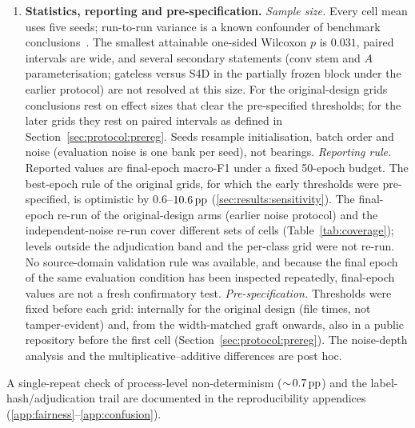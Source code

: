 \begin{enumerate}
\item \textbf{Statistics, reporting and pre-specification.} \emph{Sample size.} Every cell mean uses five seeds; run-to-run variance is a known confounder of benchmark conclusions~\cite{bouthillier2021variance,henderson2018drl}. The smallest attainable one-sided Wilcoxon $p$ is $0.031$, paired intervals are wide, and several secondary statements (conv stem and $A$ parameterisation; gateless versus S4D in the partially frozen block under the earlier protocol) are not resolved at this size. For the original-design grids conclusions rest on effect sizes that clear the pre-specified thresholds; for the later grids they rest on paired intervals as defined in Section~\ref{sec:protocol:prereg}. Seeds resample initialisation, batch order and noise (evaluation noise is one bank per seed), not bearings. \emph{Reporting rule.} Reported values are final-epoch macro-F1 under a fixed 50-epoch budget. The best-epoch rule of the original grids, for which the early thresholds were pre-specified, is optimistic by $0.6$--$10.6\,\mathrm{pp}$ (\ref{sec:results:sensitivity}). The final-epoch re-run of the original-design arms (earlier noise protocol) and the independent-noise re-run cover different sets of cells (Table~\ref{tab:coverage}); levels outside the adjudication band and the per-class grid were not re-run. No source-domain validation rule was available, and because the final epoch of the same evaluation condition has been inspected repeatedly, final-epoch values are not a fresh confirmatory test. \emph{Pre-specification.} Thresholds were fixed before each grid: internally for the original design (file times, not tamper-evident) and, from the width-matched graft onwards, also in a public repository before the first cell (Section~\ref{sec:protocol:prereg}). The noise-depth analysis and the multiplicative--additive differences are post hoc.
\end{enumerate}

A single-repeat check of process-level non-determinism ($\sim\!0.7\,\mathrm{pp}$) and the label-hash/adjudication trail are documented in the reproducibility appendices (\ref{app:fairness}--\ref{app:confusion}).
